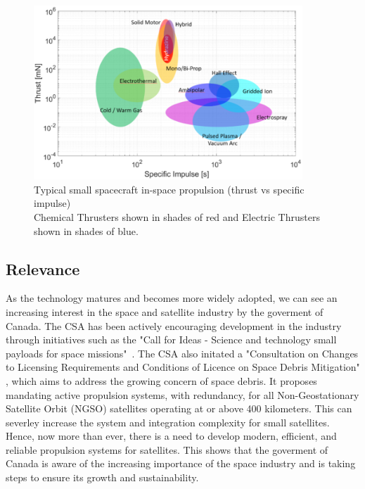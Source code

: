 \begin{figure}[H]
    \centering
    \includegraphics[width=0.9\textwidth]{images/Concepts/thrust vs specific impulse for electric systems.png}
    \captionsetup{justification=centering}
    \caption{Typical small spacecraft in-space propulsion (thrust vs specific impulse) \\ Chemical Thrusters shown in shades of red and Electric Thrusters shown in shades of blue\cite{nasa-inspace-propulsion}.}
    \label{fig:thrust_vs_specific_impulse_propulsion_systems}
\end{figure}

\subsection{Relevance}

As the technology matures and becomes more widely adopted, we can see an increasing interest in the space and satellite industry by the goverment of Canada. The \ac{CSA} has been actively encouraging development in the industry through initiatives such as the "Call for Ideas - Science and technology small payloads for space missions"~\cite{csa-call-for-ideas}. The \ac{CSA} also initated a "Consultation on Changes to Licensing Requirements and Conditions of Licence on Space Debris Mitigation" \cite{csa-space-debris-mitigation}, which aims to address the growing concern of space debris. It proposes mandating active propulsion systems, with redundancy, for all Non-Geostationary Satellite Orbit (NGSO) satellites operating at or above 400 kilometers. This can severley increase the system and integration complexity for small satellites. Hence, now more than ever, there is a need to develop modern, efficient, and reliable propulsion systems for satellites. This shows that the goverment of Canada is aware of the increasing importance of the space industry and is taking steps to ensure its growth and sustainability.

